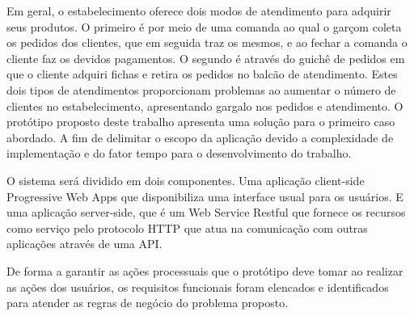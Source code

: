 Em geral, o estabelecimento oferece dois modos de atendimento para adquirir seus produtos. O primeiro é por meio de uma comanda ao qual o garçom coleta os pedidos dos clientes, que em seguida traz os mesmos, e ao fechar a comanda o cliente faz os devidos pagamentos. O segundo é através do guichê de pedidos em que o cliente adquiri fichas e retira os pedidos no balcão de atendimento. Estes dois tipos de atendimentos proporcionam problemas ao aumentar o número de clientes no estabelecimento, apresentando gargalo nos pedidos e atendimento. O protótipo proposto deste trabalho apresenta uma solução para o primeiro caso abordado. A fim de delimitar o escopo da aplicação devido a complexidade de implementação e do fator tempo para o desenvolvimento do trabalho.

O sistema será dividido em dois componentes. Uma aplicação client-side Progressive Web Apps que disponibiliza uma interface usual para os usuários. E uma aplicação server-side, que é um Web Service Restful que fornece os recursos como serviço pelo protocolo HTTP que atua na comunicação com outras aplicações através de uma API.

De forma a garantir as ações processuais que o protótipo deve tomar ao realizar as ações dos usuários, os requisitos funcionais foram elencados e identificados para atender as regras de negócio do problema proposto.


